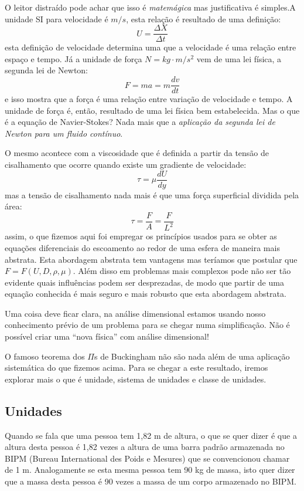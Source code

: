 O leitor distraído pode achar que isso é \emph{matemágica} mas justificativa é simples.A unidade SI para velocidade é $m/s$, esta relação é resultado de uma definição:
\[
U = \frac{\Delta X}{\Delta t}
\]
esta definição de velocidade determina uma que a velocidade é uma relação entre espaço e tempo. Já a unidade de força $N = kg\cdot m/s^2$ vem de uma lei física, a segunda lei de Newton:
\[
F = ma = m\frac{dv}{dt}
\]
e isso mostra que a força é uma relação entre variação de velocidade e tempo. A unidade de força é, então, resultado de uma lei física bem estabelecida. Mas o que é a equação de Navier-Stokes? Nada mais que a \emph{aplicação da segunda lei de Newton para um fluido contínuo}.

O mesmo acontece com a viscosidade que é definida a partir da tensão de cisalhamento que ocorre quando existe um gradiente de velocidade:
\[
\tau = \mu \frac{dU}{dy}
\]
mas a tensão de cisalhamento nada mais é que uma força superficial dividida pela área:
\[
\tau = \frac{F}{A} = \frac{F}{L^2}
\]
assim, o que fizemos aqui foi empregar os princípios usados para se obter as equações diferenciais do escoamento ao redor de uma esfera de maneira mais abstrata. Esta abordagem abstrata tem vantagens mas teríamos que postular que $F = F(U, D, \rho, \mu)$. Além disso em problemas mais complexos pode não ser tão evidente quais influências podem ser desprezadas, de modo que partir de uma equação conhecida é mais seguro e mais robusto que esta abordagem abstrata.

Uma coisa deve ficar clara, na análise dimensional estamos usando nosso conhecimento prévio de um problema para se chegar numa simplificação. Não é possível criar uma ``nova física'' com análise dimensional!

O famoso teorema dos $\Pi$s de Buckingham não são nada além de uma aplicação sistemática do que fizemos acima. Para se chegar a este resultado, iremos explorar mais o que é unidade, sistema de unidades e classe de unidades.






\subsection{Unidades}

Quando se fala que uma pessoa tem 1,82 m de altura, o que se quer dizer é que a altura desta pessoa é 1,82 vezes a altura de uma barra padrão armazenada no BIPM (Bureau International des Poids e Mesures) que se convencionou chamar de 1 m. Analogamente se esta mesma pessoa tem 90 kg de massa, isto quer dizer que a massa desta pessoa é 90 vezes a massa de um corpo armazenado no BIPM.


